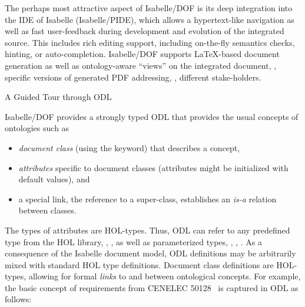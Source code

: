 \begin{isabellebody}
\begin{isamarkuptext}
  The perhaps most attractive aspect of Isabelle/DOF is its deep integration into the IDE of Isabelle 
  (Isabelle/PIDE), which allows a hypertext-like navigation as well as fast user-feedback
  during development and evolution of the integrated source. This includes rich editing support, 
  including on-the-fly semantics checks, hinting, or auto-completion. 
  Isabelle/DOF supports LaTeX-based document generation as well as ontology-aware ``views'' on 
  the integrated document, \ie, specific versions of generated PDF addressing, \eg,
  different stake-holders.
\end{isamarkuptext}\isamarkuptrue%

\begin{isamarkupsubsection*}
[label = {bgrnd_ODL},type = {scholarly_paper.background}, args={label = {bgrnd_ODL},type = {scholarly_paper.background}, Isa_COL.text_element.level = {}, Isa_COL.text_element.referentiable = {False}, Isa_COL.text_element.variants = {{STR ''outline'', STR ''document''}}, scholarly_paper.text_section.main_author = {}, scholarly_paper.text_section.fixme_list = {}, Isa_COL.text_element.level = {}}]A Guided Tour through ODL
\end{isamarkupsubsection*}\isamarkuptrue%

\begin{isamarkuptext}
Isabelle/DOF provides a strongly typed ODL that provides the usual 
concepts of ontologies such as

%
\begin{itemize}%
\item \emph{document class} (using the  keyword) that describes a concept,

\item \emph{attributes} specific to document classes (attributes might be initialized with default 
values), and

\item a special link, the reference to a super-class,
establishes an \emph{is-a} relation between classes.
\end{itemize}
\end{isamarkuptext}\isamarkuptrue%

\begin{isamarkuptext}
\vspace{-0.2cm} The types of attributes are HOL-types. Thus, ODL can refer to any predefined type 
  from the HOL library, \eg, ,  as well as parameterized types, \eg, 
  ,  . As a consequence of the Isabelle document model, ODL definitions 
  may be arbitrarily mixed with standard HOL type definitions. Document class definitions are 
  HOL-types, allowing for formal \emph{links} to and between ontological concepts. For example, the 
  basic concept of requirements from CENELEC 50128~\cite{bsi:50128:2014} is captured in ODL as 
  follows:
  

\end{isamarkuptext}
\end{isabellebody}
